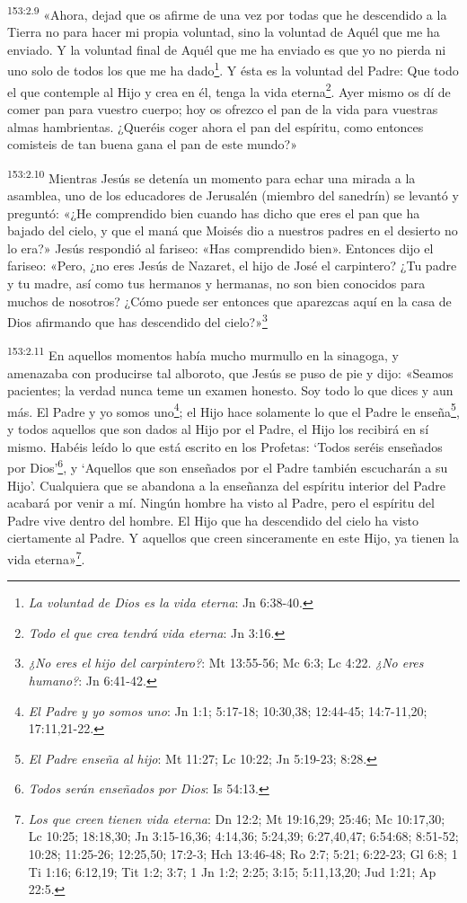 \par 
\textsuperscript{153:2.9} «Ahora, dejad que os afirme de una vez por todas que he descendido a la Tierra no para hacer mi propia voluntad, sino la voluntad de Aquél que me ha enviado. Y la voluntad final de Aquél que me ha enviado es que yo no pierda ni uno solo de todos los que me ha dado\footnote{\textit{La voluntad de Dios es la vida eterna}: Jn 6:38-40.}. Y ésta es la voluntad del Padre: Que todo el que contemple al Hijo y crea en él, tenga la vida eterna\footnote{\textit{Todo el que crea tendrá vida eterna}: Jn 3:16.}. Ayer mismo os dí de comer pan para vuestro cuerpo; hoy os ofrezco el pan de la vida para vuestras almas hambrientas. ¿Queréis coger ahora el pan del espíritu, como entonces comisteis de tan buena gana el pan de este mundo?»

\par 
\textsuperscript{153:2.10} Mientras Jesús se detenía un momento para echar una mirada a la asamblea, uno de los educadores de Jerusalén (miembro del sanedrín) se levantó y preguntó: «¿He comprendido bien cuando has dicho que eres el pan que ha bajado del cielo, y que el maná que Moisés dio a nuestros padres en el desierto no lo era?» Jesús respondió al fariseo: «Has comprendido bien». Entonces dijo el fariseo: «Pero, ¿no eres Jesús de Nazaret, el hijo de José el carpintero? ¿Tu padre y tu madre, así como tus hermanos y hermanas, no son bien conocidos para muchos de nosotros? ¿Cómo puede ser entonces que aparezcas aquí en la casa de Dios afirmando que has descendido del cielo?»\footnote{\textit{¿No eres el hijo del carpintero?}: Mt 13:55-56; Mc 6:3; Lc 4:22. \textit{¿No eres humano?}: Jn 6:41-42.}

\par 
\textsuperscript{153:2.11} En aquellos momentos había mucho murmullo en la sinagoga, y amenazaba con producirse tal alboroto, que Jesús se puso de pie y dijo: «Seamos pacientes; la verdad nunca teme un examen honesto. Soy todo lo que dices y aun más. El Padre y yo somos uno\footnote{\textit{El Padre y yo somos uno}: Jn 1:1; 5:17-18; 10:30,38; 12:44-45; 14:7-11,20; 17:11,21-22.}; el Hijo hace solamente lo que el Padre le enseña\footnote{\textit{El Padre enseña al hijo}: Mt 11:27; Lc 10:22; Jn 5:19-23; 8:28.}, y todos aquellos que son dados al Hijo por el Padre, el Hijo los recibirá en sí mismo. Habéis leído lo que está escrito en los Profetas: `Todos seréis enseñados por Dios'\footnote{\textit{Todos serán enseñados por Dios}: Is 54:13.}, y `Aquellos que son enseñados por el Padre también escucharán a su Hijo'. Cualquiera que se abandona a la enseñanza del espíritu interior del Padre acabará por venir a mí. Ningún hombre ha visto al Padre, pero el espíritu del Padre vive dentro del hombre. El Hijo que ha descendido del cielo ha visto ciertamente al Padre. Y aquellos que creen sinceramente en este Hijo, ya tienen la vida eterna»\footnote{\textit{Los que creen tienen vida eterna}: Dn 12:2; Mt 19:16,29; 25:46; Mc 10:17,30; Lc 10:25; 18:18,30; Jn 3:15-16,36; 4:14,36; 5:24,39; 6:27,40,47; 6:54:68; 8:51-52; 10:28; 11:25-26; 12:25,50; 17:2-3; Hch 13:46-48; Ro 2:7; 5:21; 6:22-23; Gl 6:8; 1 Ti 1:16; 6:12,19; Tit 1:2; 3:7; 1 Jn 1:2; 2:25; 3:15; 5:11,13,20; Jud 1:21; Ap 22:5.}.

